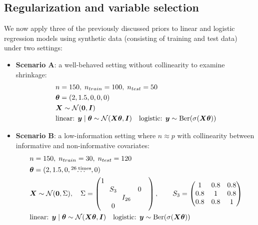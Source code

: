 \subsection{Regularization and variable selection}

We now apply three of the previously discussed priors to linear and logistic regression models using synthetic data (consisting of training and test data) under two settings:

\begin{itemize}
    \item \textbf{Scenario A}: a well-behaved setting without collinearity to examine shrinkage:
    \begin{equation*}
        \begin{aligned}
            &n = 150,\; n_{train} = 100,\;n_{test} = 50 \\
            &\bm{\theta} = (2, 1.5, 0, 0, 0) \\
            &\bm{X} \sim \mathcal{N}(\bm{0}, \bm{I}) \\
            &\text{linear: } \bm{y} \mid \bm{\theta} \sim \mathcal{N}(\bm{X} \bm{\theta},\bm{I})\quad \text{logistic: } \bm{y} \sim \text{Ber}(\sigma(\bm{X} \bm{\theta}))
        \end{aligned}
    \end{equation*}
    \item \textbf{Scenario B}: a low-information setting where $n \approx p$ with collinearity between informative and non-informative covariates:
    \begin{equation*}
        \begin{aligned}
            &n = 150,\; n_{train} = 30,\;n_{test} = 120 \\
            &\bm{\theta} = (2, 1.5, 0, \overset{26\; \text{times}}{\dots}, 0) \\
            &\bm{X} \sim \mathcal{N}(\bm{0}, \Sigma), \quad \Sigma =
                    \begin{pmatrix}
                    1 &        &         &        &        \\
                        & \!\!S_3\!\! &        & 0      &        \\
                        &        & I_{26} &        &        \\
                        & 0      &        &        &        \\
                    \end{pmatrix},
                    \qquad
                    S_3 = 
                    \begin{pmatrix}
                    1   & 0.8 & 0.8\\
                    0.8 & 1   & 0.8\\
                    0.8 & 0.8 & 1
                    \end{pmatrix}\\
            &\text{linear: } \bm{y} \mid \bm{\theta} \sim \mathcal{N}(\bm{X} \bm{\theta}, \bm{I})\quad \text{logistic: } \bm{y} \sim \text{Ber}(\sigma(\bm{X} \bm{\theta}))
        \end{aligned}
    \end{equation*}
\end{itemize}

